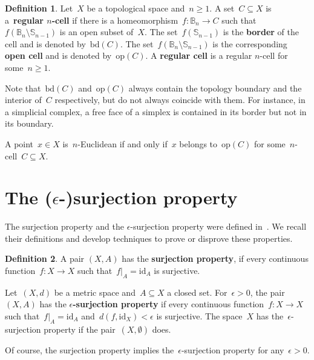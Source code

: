\documentclass[english,11pt]{article}
\theoremstyle{plain}
\theoremstyle{remark}
\theoremstyle{definition}
\newtheorem{definition}{Definition}[section]
\newcommand{\id}{\mathrm{id}}
\newcommand{\bd}[1]{\mathrm{bd}(#1)}
\newcommand{\op}[1]{\mathrm{op}(#1)}
\newcommand{\Sp}{\mathbb{S}}
\newcommand{\BB}{\mathbb{B}}
\begin{document}
\begin{definition}
Let~$X$ be a topological space and~$n\geq 1$. A set~$C\subseteq X$ is a~\textbf{regular $n$-cell} if there is a homeomorphism~$f:\BB_n\to C$ such that~$f(\BB_n\setminus \Sp_{n-1})$ is an open subset of~$X$. The set~$f(\Sp_{n-1})$ is the \textbf{border} of the cell and is denoted by~$\bd{C}$. The set~$f(\BB_n\setminus \Sp_{n-1})$ is the corresponding \textbf{open cell} and is denoted by~$\op{C}$. A \textbf{regular cell} is a regular $n$-cell for some~$n\geq 1$.
\end{definition}

Note that~$\bd{C}$ and~$\op{C}$ always contain the topology boundary and the interior of~$C$ respectively, but do not always coincide with them. For instance, in a simplicial complex, a free face of a simplex is contained in its border but not in its boundary.%

A point~$x\in X$ is~$n$-Euclidean if and only if~$x$ belongs to~$\op{C}$ for some~$n$-cell~$C\subseteq X$.

 
\section{The (\texorpdfstring{$\epsilon$}{epsilon}-)surjection property}\label{sec_surjection_property}

The surjection property and the $\epsilon$-surjection property were defined in~\cite{AH22}. We recall their definitions and develop techniques to prove or disprove these properties.
\begin{definition}
A pair $(X,A)$ has the \textbf{surjection property}, if every continuous
function~$f:X\to X$ such that~$f|_{A}=\id_{A}$ is surjective.

Let~$(X,d)$ be a metric space and~$A\subseteq X$ a closed set. For~$\epsilon>0$, the pair~$(X,A)$ has the \textbf{$\epsilon$-surjection property} if every continuous function~$f:X\to X$ such that~$f|_{A}=\id_{A}$ and~$d(f,\id_{X})<\epsilon$ is surjective. The space~$X$ has the~$\epsilon$-surjection property if the pair~$(X,\emptyset)$ does.
\end{definition}

Of course, the surjection property implies the~$\epsilon$-surjection property for any~$\epsilon>0$.
\end{document}
